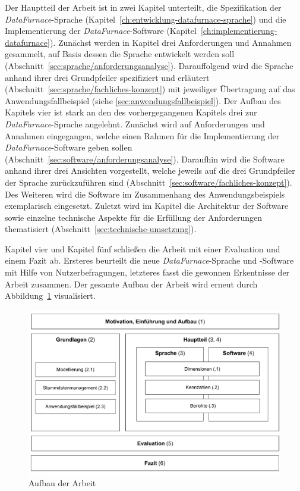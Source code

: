 \documentclass[
  language=german, %
  type=bachelor,%
  ngerman
]{isthesis}
\begin{document}
\begin{content}
  Der Hauptteil der Arbeit ist in zwei Kapitel unterteilt, die Spezifikation
  der \textit{DataFurnace}-Sprache
  (Kapitel~\ref{ch:entwicklung-datafurnace-sprache}) und die Implementierung
  der \textit{DataFurnace}-Software
  (Kapitel~\ref{ch:implementierung-datafurnace}). Zunächst werden in
  Kapitel drei Anforderungen und Annahmen gesammelt, auf Basis dessen die
  Sprache entwickelt werden soll
  (Abschnitt~\ref{sec:sprache/anforderungsanalyse}). Darauffolgend wird die
  Sprache anhand ihrer drei Grundpfeiler spezifiziert und erläutert
  (Abschnitt~\ref{sec:sprache/fachliches-konzept}) mit jeweiliger Übertragung
  auf das Anwendungsfallbeispiel (siehe \cref{sec:anwendungsfallbeispiel}).  Der
  Aufbau des Kapitels vier ist stark an den des vorhergegangenen Kapitels drei
  zur \textit{DataFurnace}-Sprache angelehnt. Zunächst wird auf Anforderungen
  und Annahmen eingegangen, welche einen Rahmen für die Implementierung der
  \textit{DataFurnace}-Software geben sollen
  (Abschnitt~\ref{sec:software/anforderungsanalyse}). Daraufhin wird die Software
  anhand ihrer drei Ansichten vorgestellt, welche jeweils auf die drei
  Grundpfeiler der Sprache zurückzuführen sind
  (Abschnitt~\ref{sec:software/fachliches-konzept}). Des Weiteren wird die
  Software im Zusammenhang des Anwendungsbeispiels exemplarisch eingesetzt.
  Zuletzt wird im Kapitel die Architektur der Software sowie einzelne
  technische Aspekte für die Erfüllung der Anforderungen thematisiert
  (Abschnitt~\ref{sec:technische-umsetzung}).

  Kapitel vier und Kapitel fünf schließen die Arbeit mit einer Evaluation und
  einem Fazit ab. Ersteres beurteilt die neue \textit{DataFurnace}-Sprache und
  -Software mit Hilfe von Nutzerbefragungen, letzteres
  fasst die gewonnen Erkentnisse der Arbeit zusammen.  Der gesamte Aufbau der
  Arbeit wird erneut durch Abbildung~\ref{fig:thesis-structure}
  visualisiert.

  \begin{figure}
    \includegraphics[scale=0.60]{content/figures/thesis-structure}
    \caption{Aufbau der Arbeit}\label{fig:thesis-structure}
  \end{figure}




\end{content}
\end{document}
